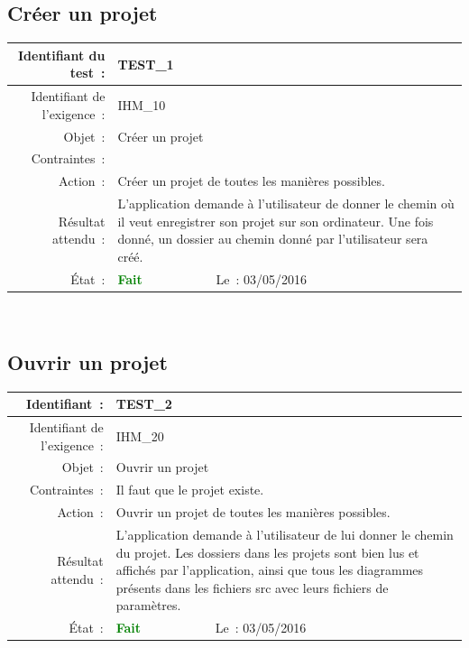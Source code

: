 \documentclass[hidelinks, a4paper,11pt,twoside,final]{article}
\begin{document}
  \subsection*{Créer un projet}
    \begin{tabular}{|r|p{5cm}|p{5cm}|}\hline
	{Identifiant du test~:} & \multicolumn{2}{|p{10cm}|}{TEST\_1} \\\hline
	{Identifiant de l’exigence~:} & \multicolumn{2}{|p{10cm}|}{IHM\_10} \\\hline
        {Objet~:} & \multicolumn{2}{|p{10cm}|}{Créer un projet} \\\hline
        {Contraintes~:} & \multicolumn{2}{|p{10cm}|}{} \\\hline
        {Action~:} & \multicolumn{2}{|p{10cm}|}{Créer un projet de toutes les manières possibles.} \\\hline
        {Résultat attendu~:} & \multicolumn{2}{|p{10cm}|}{L’application demande à l’utilisateur de donner le chemin où
                              il veut enregistrer son projet sur son ordinateur.
                              Une fois donné, un dossier au chemin donné par l’utilisateur sera créé.
                              } \\\hline
        {État~:} & {\textcolor{green}{\textbf{Fait}}} & {Le~: 03/05/2016 } \\\hline
    \end{tabular}
    \\
    \newline

    \subsection*{Ouvrir un projet}
    \begin{tabular}{|r|p{5cm}|p{5cm}|}\hline
	{Identifiant~:} & \multicolumn{2}{|p{10cm}|}{TEST\_2} \\\hline
	{Identifiant de l’exigence~:} & \multicolumn{2}{|p{10cm}|}{IHM\_20} \\\hline
        {Objet~:} & \multicolumn{2}{|p{10cm}|}{Ouvrir un projet} \\\hline
        {Contraintes~:} & \multicolumn{2}{|p{10cm}|}{Il faut que le projet existe.} \\\hline
        {Action~:} & \multicolumn{2}{|p{10cm}|}{Ouvrir un projet de toutes les manières possibles.} \\\hline
        {Résultat attendu~:} & \multicolumn{2}{|p{10cm}|}{L’application demande à l’utilisateur de lui donner le chemin du projet.
                             Les dossiers dans les projets sont bien lus et affichés par l’application, ainsi que tous les diagrammes présents
                             dans les fichiers src avec leurs fichiers de paramètres.} \\\hline
        {État~:} & {\textcolor{green}{\textbf{Fait}}} & {Le~: 03/05/2016 } \\\hline
    \end{tabular}
    \\
    \newline
\end{document}

